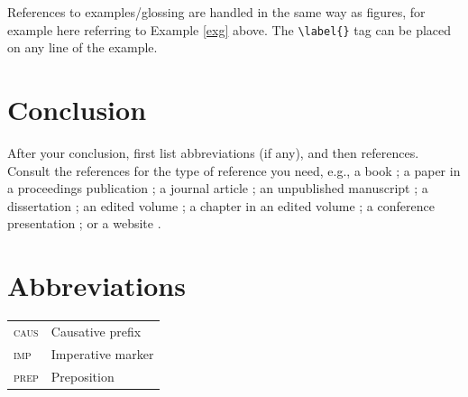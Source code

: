 References to examples/glossing are handled in the same way as figures, for example here referring to Example \ref{exg} above. The \texttt{\textbackslash label\{\}} tag can be placed on any line of the example.

\section{Conclusion}

After your conclusion, first list abbreviations (if any), and then references. Consult the references for the type of reference you need, e.g., a book \autocite{anderson2007munda}; a paper in a proceedings publication \autocite{delancey2002bodic}; a journal article \autocites{haokip2012thadou, peterson1998lai}; an unpublished manuscript \autocite{hyslop2010kurtop}; a dissertation \autocite{hyslop2011kurtop}; an edited volume \autocite{morey2008neil}; a chapter in an edited volume \autocite{peterson2003lai}; a conference presentation \autocite{post2008tani}; or a website \autocite{sadokpam2008meetei}.

\section*{Abbreviations}

\vspace{-1em} %
\begin{table}[htpb!]
    \begin{tabular}{ll}
    \textsc{caus} & Causative prefix \\
    \textsc{imp} & Imperative marker \\
    \textsc{prep} & Preposition
	\end{tabular}
\end{table}


